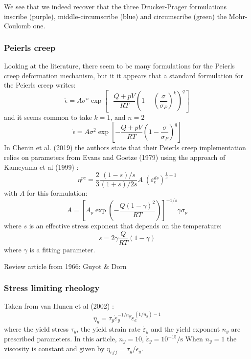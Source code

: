 We see that we indeed recover that the three Drucker-Prager formulations 
inscribe (purple), middle-circumscribe (blue) and circumscribe (green) the 
Mohr-Coulomb one. 



\newpage
\subsubsection{Peierls creep}

Looking at the literature, there seem to be many formulations for the Peierls creep deformation
mechanism, but it it appears that a standard formulation for the Peierls creep writes:
\[
\dot{\epsilon} = A \sigma^n \exp \left[ -\frac{Q+pV}{RT} \left(1-(\frac{\sigma}{\sigma_P})^k\right)^q  \right]
\]
and it seems common to take $k=1$, and $n=2$ \cite{gery10,kaka08}
\[
\dot{\epsilon} = A \sigma^2 \exp \left[ -\frac{Q+pV}{RT} \left(1-\frac{\sigma}{\sigma_P}\right)^q  \right]
\]
In Chenin et al. (2019) \cite{chmd19} the authors state that their Peierls creep implementation
relies on parameters from Evans and Goetze (1979) \cite{evgo79} using the approach of 
Kameyama et al (1999) \cite{kayk99}:
\[
\eta^{pe}=\frac{2}{3} \frac{(1-s)/s}{(1+s)/2s} A \; (\varepsilon_e^{ds})^{\frac{1}{n}-1} 
\]
with $A$ for this formulation:
\[
A = \left[ A_p \exp \left( -\frac{Q(1-\gamma)^2}{RT} \right)  \right]^{-1/s} \gamma \sigma_p
\]
where $s$ is an effective stress exponent that depends on the temperature:
\[
s = 2 \gamma \frac{Q}{RT} (1-\gamma)
\]
where $\gamma$ is a fitting parameter. 


\Literature \cite{basv06,buro11,faff11,gagd14,gery10,goev79,kaka08,kako09,kary01,mesk10,zhwa13,chsm18,shwl17}
Review article from 1966: Guyot \& Dorn \cite{gudo67}


\subsubsection{Stress limiting rheology}

Taken from van Hunen et al (2002) \cite{vavv02}:
\[
\eta_y = \tau_y \dot{\varepsilon}_y^{-1/n_y} \dot{\varepsilon}_e^{(1/n_y) -1 } 
\]
where the yield stress $\tau_y$, the yield strain rate $\dot{\varepsilon}_y$ and the yield exponent $n_y$ are
prescribed parameters. In this article, $n_y=10$, $\dot{\varepsilon}_y=10^{-15}\si{\per\second}$
When $n_y=1$ the viscosity is constant and given by $\eta_{eff} = \tau_y / \dot{\epsilon}_y$.

